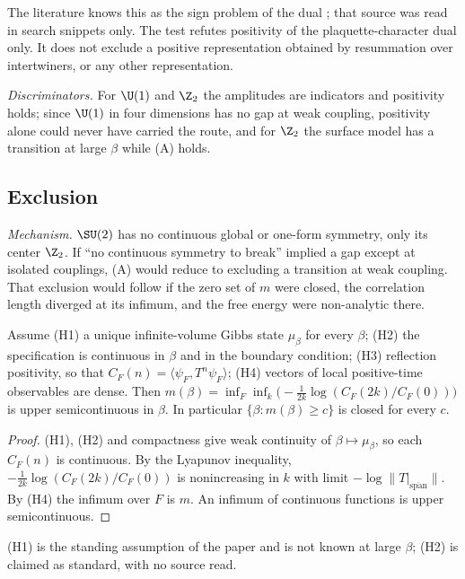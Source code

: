 The literature knows this as the sign problem of the dual \cite{CCK07}; that source was read in
search snippets only. The test refutes positivity of the plaquette-character dual only. It does
not exclude a positive representation obtained by resummation over intertwiners, or any other
representation.

\emph{Discriminators.} For $\U(1)$ and $\Z_2$ the amplitudes are indicators and positivity holds;
since $\U(1)$ in four dimensions has no gap at weak coupling, positivity alone could never have
carried the route, and for $\Z_2$ the surface model has a transition at large $\beta$ while (A)
holds.

\subsection{Exclusion}\label{neg:sub-excl}

\emph{Mechanism.} $\SU(2)$ has no continuous global or one-form symmetry, only its center
$\Z_2$. If ``no continuous symmetry to break'' implied a gap except at isolated couplings, (A)
would reduce to excluding a transition at weak coupling. That exclusion would follow if the
zero set of $m$ were closed, the correlation length diverged at its infimum, and the free energy
were non-analytic there.

\begin{lemma}\label{neg:lem-usc}
Assume \textup{(H1)} a unique infinite-volume Gibbs state $\mu_\beta$ for every $\beta$;
\textup{(H2)} the specification is continuous in $\beta$ and in the boundary condition;
\textup{(H3)} reflection positivity, so that $C_F(n)=\langle\psi_F,T^n\psi_F\rangle$;
\textup{(H4)} vectors of local positive-time observables are dense. Then
$m(\beta)=\inf_F\inf_k\bigl(-\tfrac1{2k}\log(C_F(2k)/C_F(0))\bigr)$ is upper semicontinuous in
$\beta$. In particular $\{\beta:m(\beta)\ge c\}$ is closed for every $c$.
\end{lemma}

\begin{proof}
(H1), (H2) and compactness give weak continuity of $\beta\mapsto\mu_\beta$, so each $C_F(n)$ is
continuous. By the Lyapunov inequality, $-\frac1{2k}\log(C_F(2k)/C_F(0))$ is nonincreasing in $k$
with limit $-\log\|T|_{\overline{\mathrm{span}}}\|$. By (H4) the infimum over $F$ is $m$. An
infimum of continuous functions is upper semicontinuous.
\end{proof}

(H1) is the standing assumption of the paper and is not known at large $\beta$; (H2) is claimed
as standard, with no source read.

